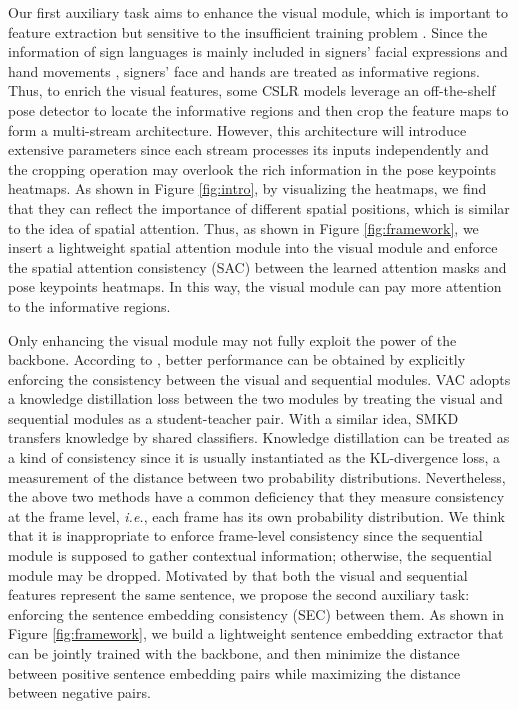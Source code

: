 \documentclass[acmsmall,screen]{acmart}
\def\ie{\emph{i.e.}} \def\Ie{\emph{I.e.}}
\begin{document}
Our first auxiliary task aims to enhance the visual module, which is important to feature extraction but sensitive to the insufficient training problem \cite{vac, dnf, stmc}.
Since the information of sign languages is mainly included in signers' facial expressions and hand movements \cite{stmc, koller2020quantitative, hu2021global}, signers' face and hands are treated as informative regions.
Thus, to enrich the visual features, some CSLR models \cite{stmc, stmc_jour, papadimitriou20_interspeech} leverage an off-the-shelf pose detector \cite{cao2019openpose, sun2019deep} to locate the informative regions and then crop the feature maps to form a multi-stream architecture.
However, this architecture will introduce extensive parameters since each stream processes its inputs independently and the cropping operation may overlook the rich information in the pose keypoints heatmaps.
As shown in Figure \ref{fig:intro}, by visualizing the heatmaps, we find that they can reflect the importance of different spatial positions, which is similar to the idea of spatial attention.
Thus, as shown in Figure \ref{fig:framework}, we insert a lightweight spatial attention module into the visual module and enforce the spatial attention consistency (SAC) between the learned attention masks and pose keypoints heatmaps.
In this way, the visual module can pay more attention to the informative regions.

Only enhancing the visual module may not fully exploit the power of the backbone.
According to \cite{vac, self-mutual}, better performance can be obtained by explicitly enforcing the consistency between the visual and sequential modules.
VAC \cite{vac} adopts a knowledge distillation loss between the two modules by treating the visual and sequential modules as a student-teacher pair.
With a similar idea, SMKD \cite{self-mutual} transfers knowledge by shared classifiers.
Knowledge distillation can be treated as a kind of consistency since it is usually instantiated as the KL-divergence loss, a measurement of the distance between two probability distributions.
Nevertheless, the above two methods have a common deficiency that they measure consistency at the frame level, \ie, each frame has its own probability distribution.
We think that it is inappropriate to enforce frame-level consistency since the sequential module is supposed to gather contextual information; otherwise, the sequential module may be dropped.
Motivated by that both the visual and sequential features represent the same sentence, we propose the second auxiliary task: enforcing the sentence embedding consistency (SEC) between them.
As shown in Figure \ref{fig:framework}, we build a lightweight sentence embedding extractor that can be jointly trained with the backbone, and then minimize the distance between positive sentence embedding pairs while maximizing the distance between negative pairs.
\end{document}
